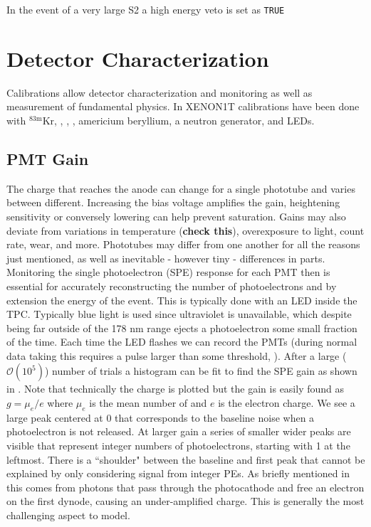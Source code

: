 In the
event of a very large S2 a high energy veto is set
as \texttt{TRUE}



\section{Detector Characterization}
\label{sec:det_char}
Calibrations allow detector characterization and monitoring as well as measurement of fundamental physics.  In XENON1T calibrations have
been done with $\mathrm{^{83m}Kr}$, , , , americium beryllium, a neutron generator, and LEDs.


\subsection{PMT Gain}
\label{subsec:det_char_pmt_gain}
The charge that reaches the anode can change for a single phototube and varies between different.  Increasing the bias voltage amplifies
the gain, heightening sensitivity or conversely lowering can help prevent saturation.  Gains may also deviate from variations in
temperature (\textbf{check this}), overexposure to light, count rate, wear, and more.  Phototubes may differ from one another
for all the reasons just mentioned, as well as inevitable - however tiny - differences in parts.  Monitoring the single photoelectron (SPE)
response for each PMT then is essential for accurately reconstructing the number of photoelectrons and by extension the energy of the
event.  This is typically done with an LED inside the TPC.  Typically blue light is used since ultraviolet is unavailable, which despite
being far outside of the 178 nm range ejects a photoelectron some small fraction of the time.  Each time the LED flashes we can record the
PMTs (during normal data taking this requires a pulse larger than some threshold, ).  After a large
($\mathcal{O}(10^{5})$)
number of trials a histogram can be fit to find the SPE gain as shown in .  Note that technically the charge
is plotted but the gain is easily found as $g = \mu_{e} / e$ where $\mu_{e}$ is the mean number of \electron and $e$ is the electron charge.  We
see a large peak centered at 0 that corresponds to the baseline noise when a photoelectron is not released.  At larger gain a series of
smaller wider peaks are visible that represent integer numbers of photoelectrons, starting with 1 at the leftmost.  There is a ``shoulder"
between the baseline and first peak that cannot be explained by only considering signal from integer PEs.  As briefly mentioned in
 this comes from photons that pass through the photocathode and free an electron on the first dynode, causing an
under-amplified charge.  This is generally the most challenging aspect to model.

